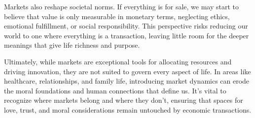 Markets also reshape societal norms. If everything is for sale, we may start to believe that value is only measurable in monetary terms, neglecting ethics, emotional fulfillment, or social responsibility. This perspective risks reducing our world to one where everything is a transaction, leaving little room for the deeper meanings that give life richness and purpose.

Ultimately, while markets are exceptional tools for allocating resources and driving innovation, they are not suited to govern every aspect of life. In areas like healthcare, relationships, and family life, introducing market dynamics can erode the moral foundations and human connections that define us. It’s vital to recognize where markets belong and where they don’t, ensuring that spaces for love, trust, and moral considerations remain untouched by economic transactions.
